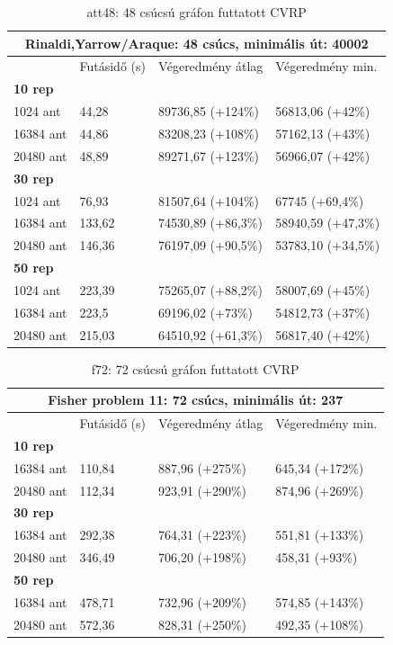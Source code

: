 \begin{table}[ht!]
	\centering
	\begin{tabular}{|p{2cm}||p{3cm}|p{3.5cm}|p{3.5cm}|}
		\hline
		\multicolumn{4}{|c|}{Rinaldi,Yarrow/Araque: 48 csúcs, minimális út: 40002} \\
		\hline
		& Futásidő (s) & Végeredmény átlag & Végeredmény min.\\
		\hline
		\textbf{10 rep} & & & \\
		1024 ant & 44,28 & 89736,85 (+124\%) & 56813,06 (+42\%) \\
		16384 ant & 44,86 & 83208,23 (+108\%) & 57162,13 (+43\%) \\
		20480 ant & 48,89 & 89271,67 (+123\%) & 56966,07 (+42\%) \\
		\hline
		\textbf{30 rep} & & & \\
		1024 ant & 76,93 & 81507,64 (+104\%) & 67745 (+69,4\%) \\
		16384 ant & 133,62 & 74530,89 (+86,3\%) & 58940,59 (+47,3\%) \\
		20480 ant & 146,36 & 76197,09 (+90,5\%) & 53783,10 (+34,5\%) \\
		\hline
		\textbf{50 rep} & & & \\
		1024 ant & 223,39 & 75265,07 (+88,2\%) & 58007,69 (+45\%) \\
		16384 ant & 223,5 & 69196,02 (+73\%) & 54812,73 (+37\%) \\
		20480 ant & 215,03 & 64510,92 (+61,3\%) & 56817,40 (+42\%) \\
		\hline
	\end{tabular}
	\caption{att48: 48 csúcsú gráfon futtatott CVRP}
	\label{table:CVRP_att48}
\end{table}

\begin{table}[ht!]
	\centering
	\begin{tabular}{|p{2cm}||p{3cm}|p{3.5cm}|p{3.5cm}|}
		\hline
		\multicolumn{4}{|c|}{Fisher problem 11: 72 csúcs, minimális út: 237} \\
		\hline
		& Futásidő (s) & Végeredmény átlag & Végeredmény min.\\
		\hline
		\textbf{10 rep} & & & \\
		16384 ant & 110,84 & 887,96 (+275\%) & 645,34 (+172\%)\\
		20480 ant & 112,34 & 923,91 (+290\%) & 874,96 (+269\%)\\
		\hline
		\textbf{30 rep} & & & \\
		16384 ant & 292,38 & 764,31 (+223\%) & 551,81 (+133\%) \\
		20480 ant & 346,49 & 706,20 (+198\%) & 458,31 (+93\%) \\
		\hline
		\textbf{50 rep} & & & \\
		16384 ant & 478,71 & 732,96 (+209\%) & 574,85 (+143\%)\\
		20480 ant & 572,36 & 828,31 (+250\%) & 492,35 (+108\%)\\
		\hline
	\end{tabular}
	\caption{f72: 72 csúcsú gráfon futtatott CVRP}
	\label{table:CVRP_f72}
\end{table}

